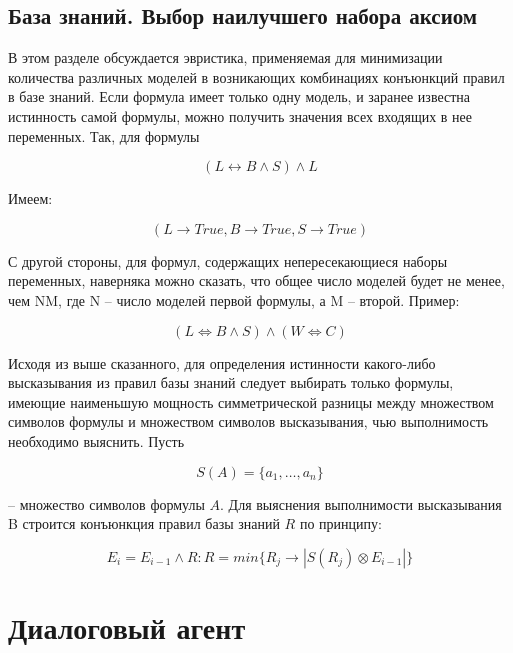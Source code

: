 \subsection{База знаний. Выбор наилучшего набора аксиом}

В этом разделе обсуждается эвристика, применяемая для минимизации
количества различных моделей в возникающих комбинациях конъюнкций правил в базе знаний. Если формула имеет только одну модель, и заранее известна
истинность самой формулы, можно получить значения всех входящих в нее
переменных. Так, для формулы

\begin{equation}(L \leftrightarrow B \land S) \land L\end{equation}                                                       

Имеем:

\begin{equation} (L \rightarrow True,B \rightarrow True,S \rightarrow True) \end{equation}

С другой стороны, для формул, содержащих непересекающиеся наборы
переменных, наверняка можно сказать, что общее число моделей будет не
менее, чем NM, где N -- число моделей первой формулы, а M -- второй.
Пример:

\begin{equation}(L \iff B \land S)\land(W \iff C)\end{equation}

Исходя из выше сказанного, для определения истинности какого-либо
высказывания из правил базы знаний следует выбирать только формулы,
имеющие наименьшую мощность симметрической разницы между множеством
символов формулы и множеством символов высказывания, чью выполнимость
необходимо выяснить. Пусть

\begin{equation}
 S(A)=\{a_1,\ldots{},a_n\}
\end{equation}

--  множество символов формулы $A$. Для выяснения выполнимости высказывания B строится конъюнкция правил базы знаний $R$ по принципу:

\begin{equation}
 E_i=E_{i-1} \land R:R=min \{ R_j \rightarrow  |S(R_j) \otimes E_{i-1}| \}
\end{equation}


\section{Диалоговый агент}

